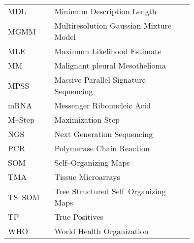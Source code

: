 \begin{longtable}[l]{lp{0.75\linewidth}}
MDL	& Minimum Description Length \\
MGMM	& Multiresolution Gaussian Mixture Model \\
MLE	& Maximum Likelihood Estimate \\
MM	& Malignant pleural Mesothelioma \\
MPSS	& Massive Parallel Signature Sequencing\\
mRNA	& Messenger Ribonucleic Acid\\
M--Step	& Maximization Step \\
NGS	& Next Generation Sequencing \\
PCR	& Polymerase Chain Reaction\\
SOM	& Self--Organizing Maps \\
TMA	& Tissue Microarrays \\
TS--SOM  & Tree Structured Self--Organizing Maps \\
TP	& True Positives \\
WHO	& World Health Organization \\



\end{longtable}
